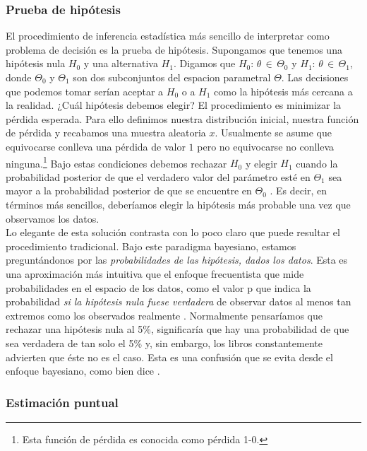 \subsubsection*{Prueba de hipótesis}

El procedimiento de inferencia estadística más sencillo de interpretar como problema de decisión es la prueba de hipótesis. Supongamos que tenemos una hipótesis nula $H_0$ y una alternativa $H_1$. Digamos que $H_0:\,\theta \,\in\,\Theta_0$ y $H_1:\,\theta \,\in\,\Theta_1$, donde $\Theta_0$ y $\Theta_1$ son dos subconjuntos del espacion parametral $\Theta$. Las decisiones que podemos tomar serían aceptar a $H_0$ o a $H_1$ como la hipótesis más cercana a la realidad. ¿Cuál hipótesis debemos elegir? El procedimiento es minimizar la pérdida esperada. Para ello definimos nuestra distribución inicial, nuestra función de pérdida y recabamos una muestra aleatoria $x$. Usualmente se asume que equivocarse conlleva una pérdida de valor $1$ pero no equivocarse no conlleva ninguna.\footnote{Esta función de pérdida es conocida como pérdida 1-0.} Bajo estas condiciones debemos rechazar $H_0$ y elegir $H_1$ cuando la probabilidad posterior de que el verdadero valor del parámetro esté en $\Theta_1$ sea mayor a la probabilidad posterior de que se encuentre en $\Theta_0$ \parencite[49-52]{Mendoza11}. Es decir, en términos más sencillos, deberíamos elegir la hipótesis más probable una vez que observamos los datos.\\ 

Lo elegante de esta solución contrasta con lo poco claro que puede resultar el procedimiento tradicional. Bajo este paradigma bayesiano, estamos preguntándonos por las \textit{probabilidades de las hipótesis, dados los datos}. Esta es una aproximación más intuitiva que el enfoque frecuentista que mide probabilidades en el espacio de los datos, como el valor p que indica la probabilidad \textit{si la hipótesis nula fuese verdadera} de observar datos al menos tan extremos como los observados realmente \parencite[2; énfasis mío.]{Congdon06}. Normalmente pensaríamos que rechazar una hipótesis nula al 5\%, significaría que hay una probabilidad de que sea verdadera de tan solo el 5\% y, sin embargo, los libros constantemente advierten que éste no es el caso. Esta es una confusión que se evita desde el enfoque bayesiano, como bien dice \textcite[xxi]{Lee12}. 

\subsubsection*{Estimación puntual}

